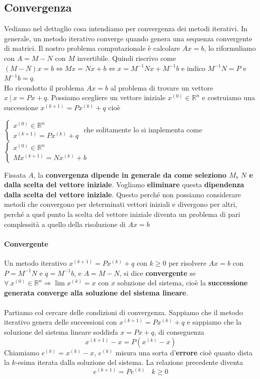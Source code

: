 \documentclass[10pt]{book}
\begin{document}
\subsection{Convergenza}
Vediamo nel dettaglio cosa intendiamo per convergenza dei metodi iterativi. In generale, un metodo iterativo converge quando genera una sequenza convergente di matrici. Il nostro problema computazionale è calcolare $Ax = b$, lo riformuliamo con $A = M - N$ con $M$ invertibile. Quindi riscrivo come $(M - N)x = b \Leftrightarrow Mx = Nx + b \Leftrightarrow x = M^{-1}N x + M^{-1}b$ e indico $M^{-1}N = P$ e $M^{-1}b = q$.\\
Ho ricondotto il problema $Ax = b$ al problema di trovare un vettore $x\:|\: x = Px + q$. Possiamo scegliere un vettore iniziale $x^{(0)} \in \mathbb{R}^n$ e costruiamo una successione $x^{(k+1)} = Px^{(k)} + q$ cioè
\begin{list}{}{}
	\item $\left\{\begin{array}{l} x^{(0)} \in \mathbb{R}^n\\x^{(k+1)} = Px^{(k)} + q \end{array}\right. $ che solitamente lo si implementa come $\left\{\begin{array}{l} x^{(0)} \in \mathbb{R}^n\\Mx^{(k+1)} = Nx^{(k)} + b \end{array}\right. $ 
\end{list}
Fissata $A$, la \textbf{convergenza dipende in generale da come seleziono $M$, $N$ e dalla scelta del vettore iniziale}. Vogliamo \textbf{eliminare} questa \textbf{dipendenza dalla scelta del vettore iniziale}. Questo perché non possiamo considerare metodi che convergono per determinati vettori iniziali e divergono per altri, perché a quel punto la scelta del vettore iniziale diventa un problema di pari complessità a quello della risoluzione di $Ax = b$
\paragraph{Convergente} Un metodo iterativo $x^{(k+1)} = Px^{(k)} + q$ con $k \geq 0$ per risolvere $Ax = b$ con $P = M^{-1}N$ e $q = M^{-1}b$, e $A = M - N$, si dice \textbf{convergente} se $\forall\:x^{(0)}\in \mathbb{R}^n \Rightarrow \lim x^{(k)} = x$ con $x$ soluzione del sistema, cioè la \textbf{successione generata converge alla soluzione del sistema lineare}.\\\\
Partiamo col cercare delle condizioni di convergenza. Sappiamo che il metodo iterativo genera delle successioni con $x^{(k+1)} = Px^{(k)} + q$ e sappiamo che la soluzione del sistema lineare soddisfa $x = Px + q$, di conseguenza
$$x^{(k+1)} - x = P(x^{(k)} - x)$$
Chiamiamo $e^{(k)} = x^{(k)} - x$, $e^{(k)}$ misura una sorta d'\textbf{errore} cioè quanto dista la $k$-esima iterata dalla soluzione del sistema. La relazione precedente diventa $$e^{(k + 1)} = Pe^{(k)}\:\:\:\: k\geq 0$$
\end{document}
